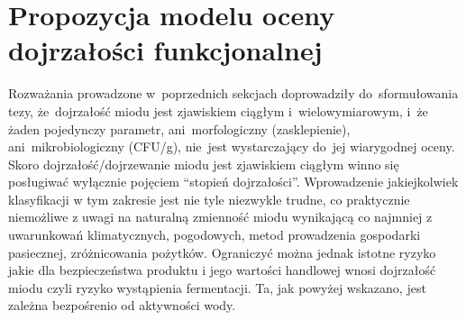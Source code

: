 
\section{Propozycja modelu oceny dojrzałości funkcjonalnej}

Rozważania prowadzone w~poprzednich sekcjach doprowadziły
do~sformułowania tezy, że~dojrzałość miodu jest zjawiskiem
ciągłym i~wielowymiarowym, i~że żaden pojedynczy parametr,
ani~morfologiczny (zasklepienie), ani~mikrobiologiczny (CFU/g),
nie~jest wystarczający do~jej wiarygodnej oceny. 
Skoro dojrzałość/dojrzewanie miodu jest zjawiskiem ciągłym winno się posługiwać wyłącznie pojęciem “stopień dojrzałości”. Wprowadzenie jakiejkolwiek klasyfikacji w tym zakresie jest nie tyle niezwykle trudne, co praktycznie niemożliwe z uwagi na naturalną zmienność miodu wynikającą co najmniej z uwarunkowań klimatycznych, pogodowych, metod prowadzenia gospodarki pasiecznej, zróżnicowania pożytków. Ograniczyć można jednak istotne ryzyko jakie dla bezpieczeństwa produktu  i jego wartości handlowej wnosi dojrzałość miodu czyli ryzyko wystąpienia fermentacji. Ta, jak powyżej  wskazano, jest zależna bezpośrenio od aktywności wody.




